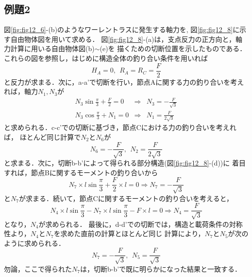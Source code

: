 \documentclass[10pt,a4j]{jbook}
\begin{document}
\subsection{例題2}
図\ref{fig:fig12_6}-(b)のようなワーレントラスに発生する軸力を, 
図\ref{fig:fig12_8}に示す自由物体図を用いて求める．
図\ref{fig:fig12_8}-(a)は，支点反力の正方向と，軸力計算に用いる自由物体図(b)$\sim$(e)を
描くための切断位置を示したものである．
これらの図を参照し，はじめに構造全体の釣り合い条件を用いれば
\begin{equation}
	H_A=0, \ \ R_A=R_C=\frac{F}{2}
\end{equation}
と反力が求まる．次に，a-a'で切断を行い，節点Aに関する力の釣り合いを考えれば，軸力$N_1,N_3$が
\begin{eqnarray}
	N_3\sin\frac{\pi}{3}+\frac{F}{2}=0 
	&\Rightarrow  & 
	N_3=-\frac{F}{\sqrt{3}} \\
	N_3\cos\frac{\pi}{3}+N_1=0
	&\Rightarrow  & 
	N_1=\frac{F}{2\sqrt{3}} 
\end{eqnarray}
と求められる．c-c'での切断に基づき，節点Cにおける力の釣り合いを考えれば，
ほとんど同じ計算で$N_2$と$N_6$が
\begin{equation}
	N_6=-\frac{F}{\sqrt{3}}, \ \ N_2=\frac{F}{2\sqrt{3}} 
	\label{eqn:}
\end{equation}
と求まる．次に，切断b-b'によって得られる部分構造(図\ref{fig:fig12_8}-(d))に
着目すれば，節点Bに関するモーメントの釣り合いから
\begin{equation}
	N_7 \times l\sin\frac{\pi}{3}+\frac{F}{2}\times l =0 \Rightarrow 
	N_7=-\frac{F}{\sqrt{3}}
\end{equation}
と$N_7$が求まる．続いて，節点Cに関するモーメントの釣り合いを考えると，
\begin{equation}
	N_4 \times l\sin\frac{\pi}{3}- N_7 \times l\sin\frac{\pi}{3} - F\times l =0 \Rightarrow 
	N_4=\frac{F}{\sqrt{3}}
\end{equation}
となり，$N_4$が求められる．
最後に，d-d'での切断では，構造と載荷条件の対称性より，$N_4$と$N_7$を求めた直前の計算とほとんど同じ
計算により，$N_7$と$N_5$が次のように求められる．
\begin{equation}
	N_7=-\frac{F}{\sqrt{3}}
	, \ \ 
	N_5=\frac{F}{\sqrt{3}}
	\label{eqn:}
\end{equation}
勿論，ここで得られた$N_7$は，切断b-b'で既に明らかになった結果と一致する．\\
\end{document}
